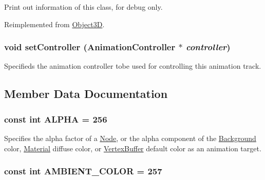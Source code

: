 Print out information of this class, for debug only. 

Reimplemented from \hyperlink{classm3g_1_1Object3D_6fea17fa1532df3794f8cb39cb4f911f}{Object3D}.\hypertarget{classm3g_1_1AnimationTrack_639279dfdc74095fcb28d0c25aeec6df}{
\subsubsection[{setController}]{\setlength{\rightskip}{0pt plus 5cm}void setController ({\bf AnimationController} $\ast$ {\em controller})}}
\label{classm3g_1_1AnimationTrack_639279dfdc74095fcb28d0c25aeec6df}


Specifieds the animation controller tobe used for controlling this animation track. 

\subsection{Member Data Documentation}
\hypertarget{classm3g_1_1AnimationTrack_417581fcde4067111f47320edb2aa378}{
\subsubsection[{ALPHA}]{\setlength{\rightskip}{0pt plus 5cm}const int {\bf ALPHA} = 256}}
\label{classm3g_1_1AnimationTrack_417581fcde4067111f47320edb2aa378}


Specifies the alpha factor of a \hyperlink{classm3g_1_1Node}{Node}, or the alpha component of the \hyperlink{classm3g_1_1Background}{Background} color, \hyperlink{classm3g_1_1Material}{Material} diffuse color, or \hyperlink{classm3g_1_1VertexBuffer}{VertexBuffer} default color as an animation target. \hypertarget{classm3g_1_1AnimationTrack_71b6e9c23b95f8011da4565f4a12f677}{
\subsubsection[{AMBIENT\_\-COLOR}]{\setlength{\rightskip}{0pt plus 5cm}const int {\bf AMBIENT\_\-COLOR} = 257}}
\label{classm3g_1_1AnimationTrack_71b6e9c23b95f8011da4565f4a12f677}


